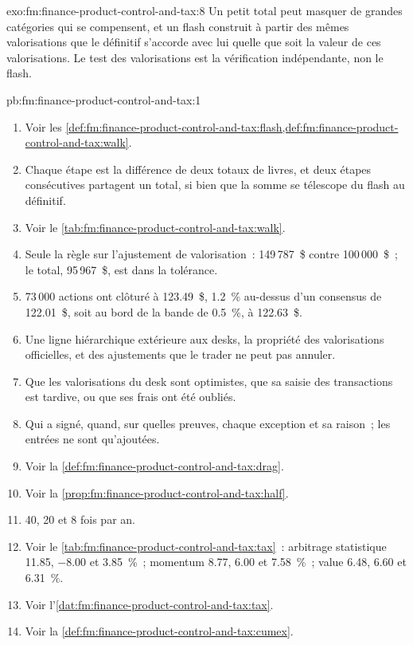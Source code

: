 \begin{solution}{exo:fm:finance-product-control-and-tax:8}
Un petit total peut masquer de grandes catégories qui se compensent, et un flash construit à partir des mêmes valorisations que le définitif s'accorde avec lui quelle que soit la valeur de ces valorisations.
Le test des valorisations est la vérification indépendante, non le flash.
\end{solution}

\begin{solution}{pb:fm:finance-product-control-and-tax:1}
\begin{enumerate}
\item Voir les \cref{def:fm:finance-product-control-and-tax:flash,def:fm:finance-product-control-and-tax:walk}.
\item Chaque étape est la différence de deux totaux de livres, et deux étapes consécutives partagent un total, si bien que la somme se télescope du flash au définitif.
\item Voir le \cref{tab:fm:finance-product-control-and-tax:walk}.
\item Seule la règle sur l'ajustement de valorisation~: 149\,787~\$ contre 100\,000~\$~; le total, 95\,967~\$, est dans la tolérance.
\item 73\,000 actions ont clôturé à 123.49~\$, 1.2~\% au-dessus d'un consensus de 122.01~\$, soit au bord de la bande de 0.5~\%, à 122.63~\$.
\item Une ligne hiérarchique extérieure aux desks, la propriété des valorisations officielles, et des ajustements que le trader ne peut pas annuler.
\item Que les valorisations du desk sont optimistes, que sa saisie des transactions est tardive, ou que ses frais ont été oubliés.
\item Qui a signé, quand, sur quelles preuves, chaque exception et sa raison~; les entrées ne sont qu'ajoutées.
\item Voir la \cref{def:fm:finance-product-control-and-tax:drag}.
\item Voir la \cref{prop:fm:finance-product-control-and-tax:half}.
\item 40, 20 et 8 fois par an.
\item Voir le \cref{tab:fm:finance-product-control-and-tax:tax}~: arbitrage statistique 11.85, $-8.00$ et 3.85~\%~; momentum 8.77, 6.00 et 7.58~\%~; value
6.48, 6.60 et 6.31~\%.
\item Voir l'\cref{dat:fm:finance-product-control-and-tax:tax}.
\item Voir la \cref{def:fm:finance-product-control-and-tax:cumex}.

\end{enumerate}
\end{solution}
